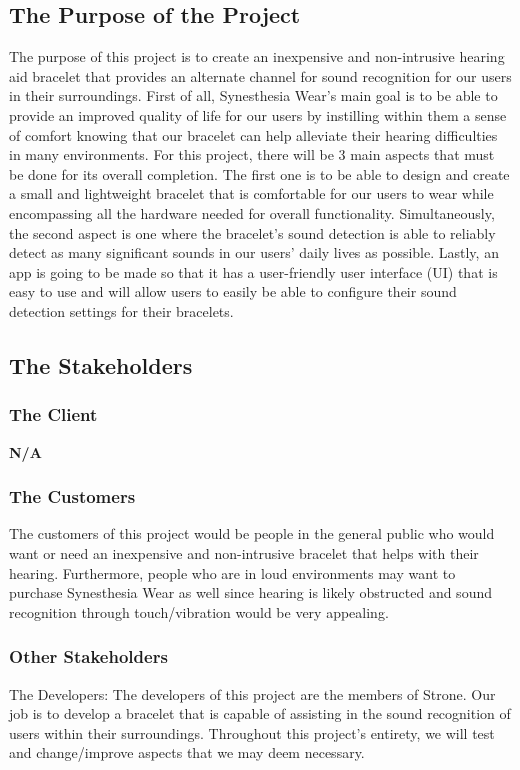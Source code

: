 \documentclass[12pt]{article}
\begin{document}
\subsection{The Purpose of the Project}
The purpose of this project is to create an inexpensive and non-intrusive hearing aid 
bracelet that provides an alternate channel for sound recognition for our users in their 
surroundings. First of all, Synesthesia Wear's main goal is to be able to provide an 
improved quality of life for our users by instilling within them a sense of comfort 
knowing that our bracelet can help alleviate their hearing difficulties in many environments. 
For this project, there will be 3 main aspects that must be done for its overall completion. 
The first one is to be able to design and create a small and lightweight bracelet that 
is comfortable for our users to wear while encompassing all the hardware needed for 
overall functionality. Simultaneously, the second aspect is one where the bracelet's 
sound detection is able to reliably detect as many significant sounds in our users' daily 
lives as possible. Lastly, an app is going to be made so that it has a user-friendly user interface (UI) that is easy to use and will allow users to easily be able to configure their sound 
detection settings for their bracelets.

\subsection{The Stakeholders}

\subsubsection{The Client}
\textbf{N/A}

\subsubsection{The Customers}
The customers of this project would be people in the general public who would want or 
need an inexpensive and non-intrusive bracelet that helps with their hearing. Furthermore, 
people who are in loud environments may want to purchase Synesthesia Wear as well since 
hearing is likely obstructed and sound recognition through touch/vibration would be very 
appealing.

\subsubsection{Other Stakeholders}
The Developers:
The developers of this project are the members of Strone. Our job is to develop a 
bracelet that is capable of assisting in the sound recognition of users within their 
surroundings. Throughout this project's entirety, we will test and change/improve 
aspects that we may deem necessary.
\end{document}
